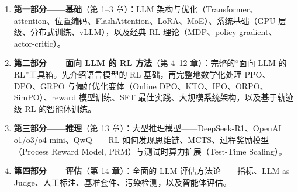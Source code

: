 \documentclass[11pt,a4paper,openany]{book}
\begin{document}
\begin{enumerate}
  \item \textbf{第一部分——基础}（第 1--3 章）：LLM 架构与优化（Transformer、attention、位置编码、FlashAttention、LoRA、MoE）、系统基础（GPU 层级、分布式训练、vLLM），以及经典 RL 理论（MDP、policy gradient、actor-critic）。
  \item \textbf{第二部分——面向 LLM 的 RL 方法}（第 4--12 章）：完整的“面向 LLM 的 RL”工具箱。先介绍语言模型的 RL 基础，再完整地数学化处理 PPO、DPO、GRPO 与偏好优化变体（Online DPO、KTO、IPO、ORPO、SimPO）、reward 模型训练、SFT 最佳实践、大规模系统架构，以及基于轨迹级 RL 的智能体训练。
  \item \textbf{第三部分——推理}（第 13 章）：大型推理模型——DeepSeek-R1、OpenAI o1/o3/o4-mini、QwQ——RL 如何发现思维链、MCTS、过程奖励模型（Process Reward Model, PRM）与测试时算力扩展（Test-Time Scaling）。
  \item \textbf{第四部分——评估}（第 14 章）：全面的 LLM 评估方法论——指标、LLM-as-Judge、人工标注、基准套件、污染检测，以及智能体评估。

\end{enumerate}
\end{document}
